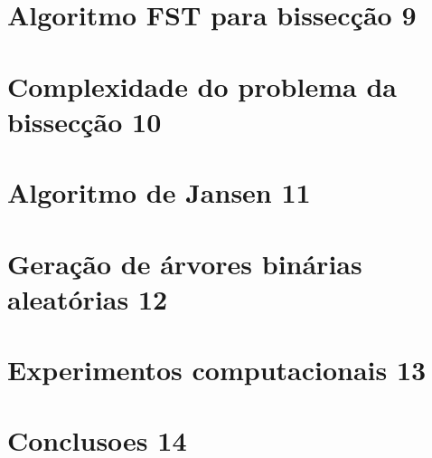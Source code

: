 \documentclass[a4paper,12pt]{article}
\begin{document}
\section {Algoritmo FST para bissecção 9}



\section {Complexidade do problema da bissecção 10}



\section {Algoritmo de Jansen 11}



\section {Geração de árvores binárias aleatórias 12}



\section {Experimentos computacionais 13}



\section {Conclusoes 14}



\newpage


\end{document}

